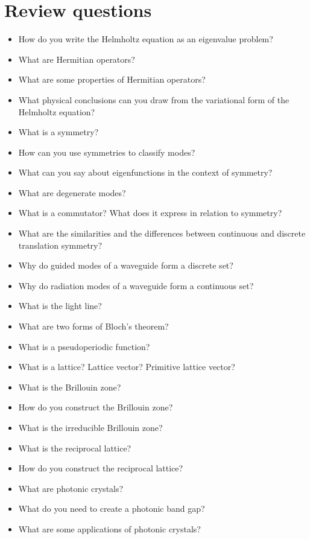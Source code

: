 \section*{Review questions}

\begin{itemize}
\item How do you write the Helmholtz equation as an eigenvalue problem?
\item What are Hermitian operators?
\item What are some properties of Hermitian operators?
\item What physical conclusions can you draw from the variational form of the Helmholtz equation?
\item What is a symmetry?
\item How can you use symmetries to classify modes?
\item What can you say about eigenfunctions in the context of symmetry? 
\item What are degenerate modes?
\item What is a commutator? What does it express in relation to symmetry?
\item What are the similarities and the differences between continuous and discrete translation symmetry?
\item Why do guided modes of a waveguide form a discrete set?  
\item Why do radiation modes of a waveguide form a continuous set?
\item What is the light line?
\item What are two forms of Bloch's theorem?
\item What is a pseudoperiodic function?
\item What is a lattice? Lattice vector? Primitive lattice vector?
\item What is the Brillouin zone?
\item How do you construct the Brillouin zone?  
\item What is the irreducible Brillouin zone?  
\item What is the reciprocal lattice?
\item How do you construct the reciprocal lattice?
\item What are photonic crystals?
\item What do you need to create a photonic band gap?  
\item What are some applications of photonic crystals?  
\end{itemize}





